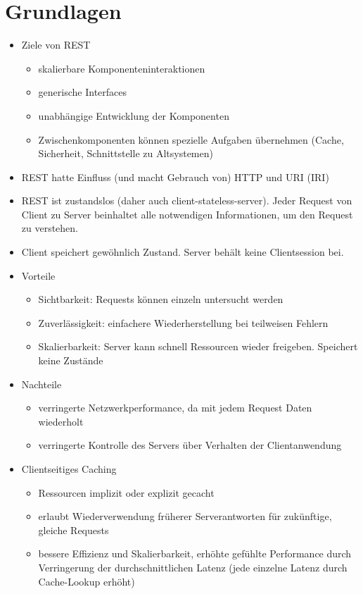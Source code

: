 \section{Grundlagen}
\begin{itemize}
  \item Ziele von REST
  \begin{itemize}
    \item skalierbare Komponenteninteraktionen
    \item generische Interfaces
    \item unabhängige Entwicklung der Komponenten
    \item Zwischenkomponenten können spezielle Aufgaben übernehmen (Cache, Sicherheit, Schnittstelle zu Altsystemen)
  \end{itemize}
  \item REST hatte Einfluss (und macht Gebrauch von) HTTP und URI (IRI)
  \item REST ist zustandslos (daher auch client-stateless-server). Jeder Request von Client zu Server beinhaltet alle notwendigen Informationen, um den Request zu verstehen.
  \item Client speichert gewöhnlich Zustand. Server behält keine Clientsession bei.
  \item Vorteile
  \begin{itemize}
    \item Sichtbarkeit: Requests können einzeln untersucht werden
    \item Zuverlässigkeit: einfachere Wiederherstellung bei teilweisen Fehlern
    \item Skalierbarkeit: Server kann schnell Ressourcen wieder freigeben. Speichert keine Zustände
  \end{itemize}
  \item Nachteile
  \begin{itemize}
    \item verringerte Netzwerkperformance, da mit jedem Request Daten wiederholt
    \item verringerte Kontrolle des Servers über Verhalten der Clientanwendung
  \end{itemize}
  \item Clientseitiges Caching
  \begin{itemize}
    \item Ressourcen implizit oder explizit gecacht
    \item erlaubt Wiederverwendung früherer Serverantworten für zukünftige, gleiche Requests
    \item bessere Effizienz und Skalierbarkeit, erhöhte gefühlte Performance durch Verringerung der durchschnittlichen Latenz (jede einzelne Latenz durch Cache-Lookup erhöht)

\end{itemize}
\end{itemize}
